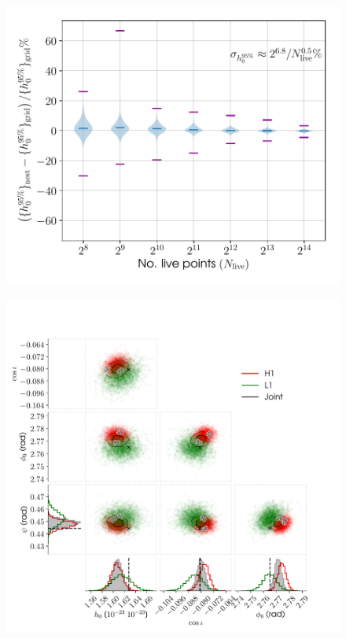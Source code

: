 \begin{figure}[!phtb]
\begin{center}
\includegraphics[width=1\columnwidth]{./figures/codeeval/stats/uls/uls}
\caption{ \protect}
\end{center}
\end{figure}


\begin{figure}[!phtb]
\begin{center}
\includegraphics[width=1\columnwidth]{./figures/codeeval/simulations/S6_hwinj/hwinj03/hwinj03}
\caption{ \protect}
\end{center}
\end{figure}


